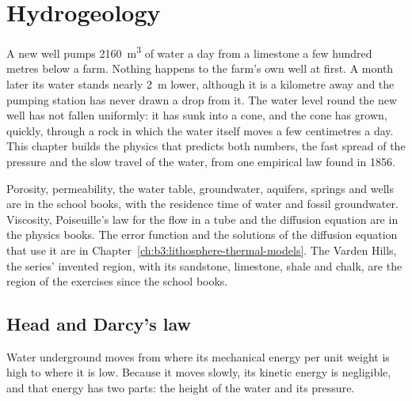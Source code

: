 \chapter{Hydrogeology}\label{ch:b3:hydrogeology}

A new well pumps \qty{2160}{m^3} of water a day from a limestone a few
hundred metres below a farm. Nothing happens to the farm's own well at
first. A month later its water stands nearly \qty{2}{m} lower, although it is
a kilometre away and the pumping station has never drawn a drop from it. The
water level round the new well has not fallen uniformly: it has sunk into a
cone, and the cone has grown, quickly, through a rock in which the water
itself moves a few centimetres a day. This chapter builds the physics that
predicts both numbers, the fast spread of the pressure and the slow travel
of the water, from one empirical law found in 1856.

\begin{recall}
Porosity, permeability, the water table, groundwater, aquifers, springs
and wells are in the school books, with the residence time of water and
fossil groundwater. Viscosity, Poiseuille's law for the flow in a tube
and the diffusion equation are in the physics books. The error function
and the solutions of the diffusion equation that use it are in
Chapter~\ref{ch:b3:lithosphere-thermal-models}. The Varden Hills, the
series' invented region, with its sandstone, limestone, shale and chalk,
are the region of the exercises since the school books.
\end{recall}

\section{Head and Darcy's law}\label{sec:b3:hydrogeology:darcy}

Water underground moves from where its mechanical energy per unit weight is
high to where it is low. Because it moves slowly, its kinetic energy is
negligible, and that energy has two parts: the height of the water and its
pressure.

